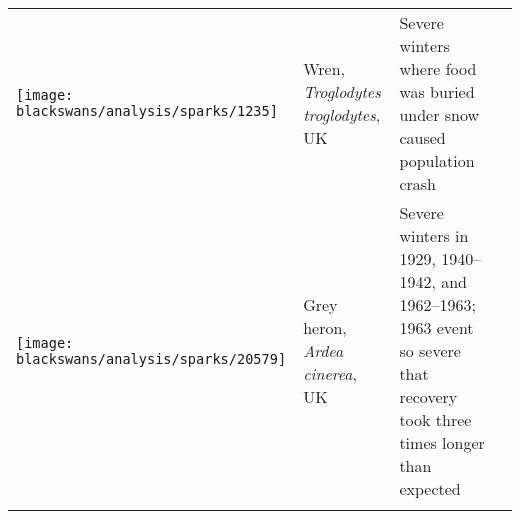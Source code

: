 \begin{small}
\begin{longtable}{>{\RaggedRight}m{2.0cm}>{\RaggedRight}p{3.0cm}>{\RaggedRight}p{7.0cm}>{\RaggedRight}p{2.0cm}}
\texttt{[image: blackswans/analysis/sparks/1235]} &
Wren,
\textit{Troglodytes troglodytes},
UK &
Severe winters where food was buried under snow caused population crash &
\citep{newton1998} \\

\texttt{[image: blackswans/analysis/sparks/20579]} &
Grey heron,
\textit{Ardea cinerea},
UK &
Severe winters in 1929, 1940--1942, and 1962--1963; 1963 event so severe that
recovery took three times longer than expected &
\citep{stafford1971} \\





\bottomrule
\label{tab:sparks}
\end{longtable}
\end{small}

